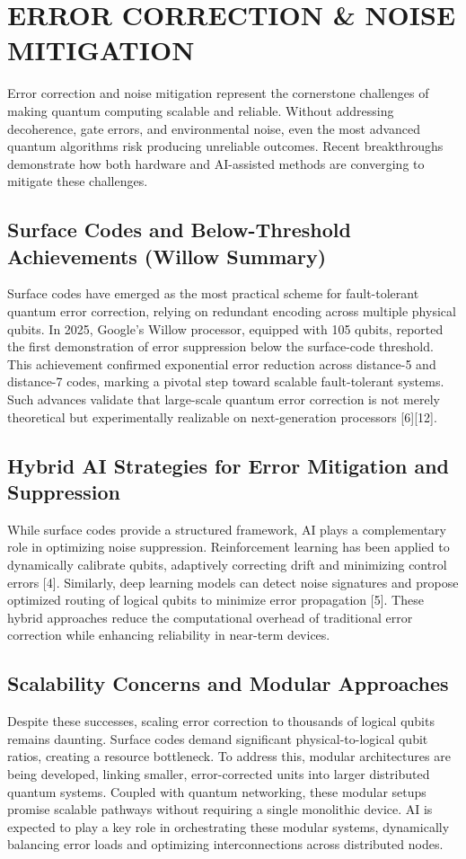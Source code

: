 \chapter{ERROR CORRECTION \& NOISE MITIGATION}
\hspace*{0.3in}Error correction and noise mitigation represent the cornerstone challenges of making quantum computing scalable and reliable. Without addressing decoherence, gate errors, and environmental noise, even the most advanced quantum algorithms risk producing unreliable outcomes. Recent breakthroughs demonstrate how both hardware and AI-assisted methods are converging to mitigate these challenges.
\section{Surface Codes and Below-Threshold Achievements (Willow Summary)}
\hspace*{0.3in}Surface codes have emerged as the most practical scheme for fault-tolerant quantum error correction, relying on redundant encoding across multiple physical qubits. In 2025, Google’s Willow processor, equipped with 105 qubits, reported the first demonstration of error suppression below the surface-code threshold. This achievement confirmed exponential error reduction across distance-5 and distance-7 codes, marking a pivotal step toward scalable fault-tolerant systems. Such advances validate that large-scale quantum error correction is not merely theoretical but experimentally realizable on next-generation processors [6][12].
\section{Hybrid AI Strategies for Error Mitigation and Suppression}
\hspace*{0.3in}While surface codes provide a structured framework, AI plays a complementary role in optimizing noise suppression. Reinforcement learning has been applied to dynamically calibrate qubits, adaptively correcting drift and minimizing control errors [4]. Similarly, deep learning models can detect noise signatures and propose optimized routing of logical qubits to minimize error propagation [5]. These hybrid approaches reduce the computational overhead of traditional error correction while enhancing reliability in near-term devices.
\section{Scalability Concerns and Modular Approaches}
\hspace*{0.3in}Despite these successes, scaling error correction to thousands of logical qubits remains daunting. Surface codes demand significant physical-to-logical qubit ratios, creating a resource bottleneck. To address this, modular architectures are being developed, linking smaller, error-corrected units into larger distributed quantum systems. Coupled with quantum networking, these modular setups promise scalable pathways without requiring a single monolithic device. AI is expected to play a key role in orchestrating these modular systems, dynamically balancing error loads and optimizing interconnections across distributed nodes.